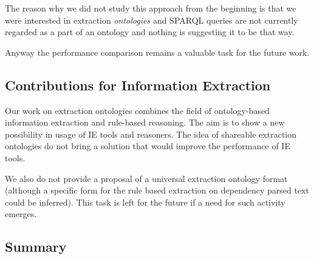 The reason why we did not study this approach from the beginning is that we were interested in extraction \emph{ontologies} and SPARQL queries are not currently regarded as a part of an ontology and nothing is suggesting it to be that way.  

Anyway the performance comparison remains a valuable task for the future work.

\subsection{Contributions for Information Extraction}

Our work on extraction ontologies combines the field of ontology-based information extraction and rule-based reasoning. The aim is to show a new possibility in usage of IE tools and reasoners. The idea of shareable extraction ontologies do not bring a solution that would improve the performance of IE tools.

We also do not provide a proposal of a universal extraction ontology format (although a specific form for the rule based extraction on dependency parsed text could be inferred). This task is left for the future if a need for such activity emerges.


\subsection{Summary} \label{sec:onto_conclusion}


